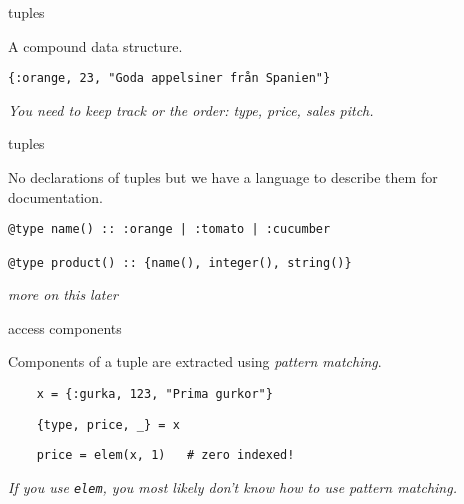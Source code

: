 \begin{frame}{tuples}

  A compound data structure. \pause

  \vspace{20pt}

  {\tt \{:orange, 23, "Goda appelsiner från Spanien"\}}  \pause

  \vspace{20pt}

  {\em You need to keep track or the order: type, price, sales pitch.}

\end{frame}

\begin{frame}[fragile]{tuples}

  No declarations of tuples but we have a language to describe them
  for documentation.\pause

  \vspace{20pt}  
  \begin{lstlisting}
@type name() :: :orange | :tomato | :cucumber

@type product() :: {name(), integer(), string()}
  \end{lstlisting}

  \pause
  \vspace{10pt}
  {\em more on this later}

\end{frame}

\begin{frame}[fragile]{access components}

  Components of a tuple are extracted using {\em pattern matching}.\pause

  \begin{lstlisting}
    x = {:gurka, 123, "Prima gurkor"}
  \end{lstlisting}

  \pause
  \vspace{20pt}

  \begin{lstlisting}
    {type, price, _} = x 
  \end{lstlisting}  

  \vspace{20pt}

  \begin{lstlisting}
    price = elem(x, 1)   # zero indexed!
  \end{lstlisting}    

  \vspace{10pt}
  {\em If you use {\tt elem}, you most likely don't know how to use pattern matching.}
  
\end{frame}

